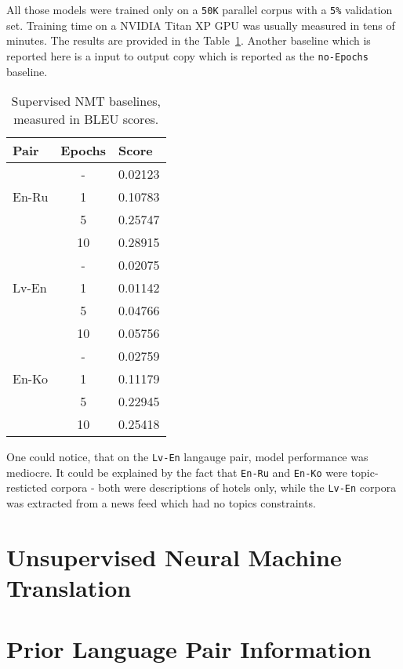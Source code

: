 \documentclass[]{article}
\begin{document}
All those models were trained only on a {\tt 50K} parallel corpus with a {\tt 5\%} validation set.
Training time on a NVIDIA Titan XP GPU was usually measured in tens of minutes.
The results are provided in the Table~\ref{table:baselines}.
Another baseline which is reported here is a input to output copy which is reported as the {\tt no-Epochs} baseline.

\begin{table}
\begin{center}
\begin{tabular}{ l c l }
Pair & Epochs & Score \\
\hline
\multirow{3}{4em}{En-Ru} & - & 0.02123 \\
& 1 & 0.10783 \\
& 5 & 0.25747 \\
& 10 & 0.28915 \\
\hline
\multirow{3}{4em}{Lv-En} & - & 0.02075 \\
& 1 & 0.01142 \\
& 5 & 0.04766 \\
& 10 & 0.05756 \\
\hline
\multirow{3}{4em}{En-Ko} & - & 0.02759 \\
& 1 & 0.11179 \\
& 5 & 0.22945 \\
& 10 & 0.25418 \\
\end{tabular}
\end{center}
\caption{Supervised NMT baselines, measured in BLEU scores.}
\label{table:baselines}
\end{table}

One could notice, that on the {\tt Lv-En} langauge pair, model performance was mediocre.
It could be explained by the fact that {\tt En-Ru} and {\tt En-Ko} were topic-resticted corpora - both were descriptions of hotels only, while the {\tt Lv-En} corpora was extracted from a news feed which had no topics constraints.

\section{Unsupervised Neural Machine Translation}
\label{sect:unmt}

\section{Prior Language Pair Information}
\label{sect:nonoblivious}
\end{document}
